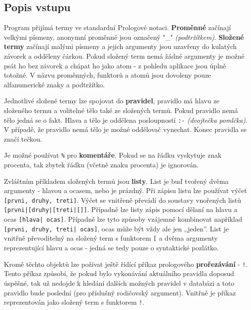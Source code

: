 \documentclass[12pt,a4paper,titlepage]{scrartcl}
\begin{document}
	\subsection{Popis vstupu}
	Program přijímá termy ve standardní Prologové notaci. \textbf{Proměnné} začínají velkými písmeny, anonymní proměnné jsou označený "\_" \textit{(podtržítkem)}. \textbf{Složené termy} začínají malými písmeny a jejich argumenty jsou uzavřeny do kulatých závorek a odděleny čárkou. Pokud složený term nemá žádné argumenty je možné psát ho bez závorek a chápat ho jako atom - z pohledu aplikace jsou úplně totožné. V názvu proměnných, funktorů a atomů jsou dovoleny pouze alfanumerické znaky a podtržítko.
	\par
	Jednotlivé složené termy lze spojovat do \textbf{pravidel}, pravidlo má hlavu ze složeného termu a volitelné tělo také ze složených termů. Pokud pravidlo nemá tělo jedná se o fakt. Hlava a tělo je oddělena posloupností \texttt{:-} \textit{(dvojtečka pomlčka)}. V případě, že pravidlo nemá tělo je možné oddělovač vynechat. Konec pravidla se značí tečkou.
	\par
	Je možné používat \texttt{\%} pro \textbf{komentáře}. Pokud se na řádku vyskytuje znak procenta, tak zbytek řádku (včetně znaku procenta) je ignorován.
	\par 
	Zvláštním příkladem složených termů jsou \textbf{listy}. List je buď tvořený dvěma argumenty - hlavou a ocasem, nebo je prázdný. Při zápisu listu lze používat výčet \texttt{[prvni, druhy, treti]}. Výčet se vnitřeně převádí do soustavy vnořených listů \texttt{[prvni|[druhy|[treti|[]]}. Případně lze listy zápis pomocí dělaní na hlavu a ocas \texttt{[hlava| ocas]}. Případně lze tyto způsoby vzájemně kombinovat například \texttt{[prvni, druhy, treti| ocas]}, ocas může být vždy ale jen ,,jeden''. List je vnitřně převoditelný na složený term s funktorem \texttt{[} a dvěma argumenty reprezentující hlavu a ocas - jedná se tedy pouze o syntaktické pozlátko.
	\par
	Kromě těchto objektů lze požívat ještě řídící příkaz prologového \textbf{prořezávání} - \texttt{!}. Tento příkaz způsobí, že pokud bylo vykonávání aktuálního pravidla doposud úspěšné, tak už nedojde k hledání dalších možných pravidel v databázi a toto pravidlo bude poslední (pro příslušný rodičovský argument). Vnitřně je příkaz reprezentován jako složený term s funktorem \texttt{!}.
	
\end{document}
